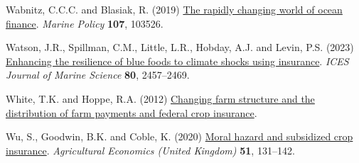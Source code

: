 \documentclass[
  letterpaper,
  DIV=11,
  numbers=noendperiod]{scrartcl}
\newlength{\cslhangindent}
\newlength{\cslentryspacingunit} %
\newenvironment{CSLReferences}[2] %
 {%
  \setlength{\parindent}{0pt}
  \ifodd #1
  \let\oldpar\par
  \def\par{\hangindent=\cslhangindent\oldpar}
  \fi
  \setlength{\parskip}{#2\cslentryspacingunit}
 }%
 {}
\theoremstyle{plain}
\theoremstyle{plain}
\theoremstyle{remark}
\begin{document}
\begin{CSLReferences}{1}{0}
\leavevmode{}%
Wabnitz, C.C.C. and Blasiak, R. (2019)
\href{https://doi.org/10.1016/j.marpol.2019.103526}{The rapidly changing
world of ocean finance}. \emph{Marine Policy} \textbf{107}, 103526.

\leavevmode{}%
Watson, J.R., Spillman, C.M., Little, L.R., Hobday, A.J. and Levin, P.S.
(2023) \href{https://doi.org/10.1093/icesjms/fsad175}{Enhancing the
resilience of blue foods to climate shocks using insurance}. \emph{ICES
Journal of Marine Science} \textbf{80}, 2457--2469.

\leavevmode{}%
White, T.K. and Hoppe, R.A. (2012)
\href{https://www.ers.usda.gov}{Changing farm structure and the
distribution of farm payments and federal crop insurance}.

\leavevmode{}%
Wu, S., Goodwin, B.K. and Coble, K. (2020)
\href{https://doi.org/10.1111/agec.12545}{Moral hazard and subsidized
crop insurance}. \emph{Agricultural Economics (United Kingdom)}
\textbf{51}, 131--142.

\end{CSLReferences}
\end{document}
